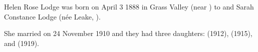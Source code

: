 
Helen Rose Lodge was born on April 3 1888 in Grass Valley (near )\cite{FamilyNotices} 
to 
and Sarah Constance Lodge (n\'{e}e Leake, ).\cite{BMD}

She married\cite{HAHmarriage}  on 24 November 1910\cite{HallLodgeWedding} and they had three daughters:
 (1912),
 (1915), and
 (1919).
